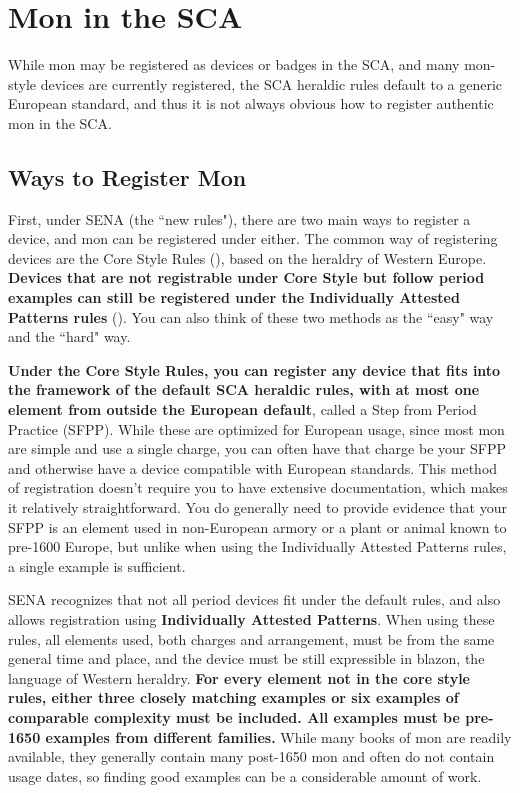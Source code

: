 \documentclass{article}
\begin{document}
\section{Mon in the SCA}

  While mon may be registered as devices or badges in the SCA, and
  many mon-style devices are currently registered, the SCA heraldic
  rules default to a generic European standard, and thus it is not
  always obvious how to register authentic mon in the SCA.

\subsection{Ways to Register Mon}

  First, under SENA (the ``new rules"), there are two main ways to
  register a device, and mon can be registered under either.  The
  common way of registering devices are the Core Style Rules 
  (), based on
  the heraldry of Western Europe.  \textbf{Devices that are not registrable
  under Core Style but follow period examples can still be registered
  under the Individually Attested Patterns rules}
  ().  You can also
  think of these two methods as the ``easy" way and the ``hard" way.

  \textbf{Under the Core Style Rules, you can register any device that fits
  into the framework of the default SCA heraldic rules, with at most
  one element from outside the European default}, called a Step from
  Period Practice (SFPP).  While these are optimized for European
  usage, since most mon are simple and use a single charge, you can
  often have that charge be your SFPP and otherwise have a device
  compatible with European standards.  This method of registration
  doesn't require you to have extensive documentation, which makes it
  relatively straightforward.  You do generally need to provide
  evidence that your SFPP is an element used in non-European armory or
  a plant or animal known to pre-1600 Europe, but unlike when using
  the Individually Attested Patterns rules, a single example is
  sufficient.

  SENA recognizes that not all period devices fit under the default
  rules, and also allows registration using \textbf{Individually Attested
  Patterns}. When using these rules, all elements used, both charges
  and arrangement, must be from the same general time and place, and
  the device must be still expressible in blazon, the language of
  Western heraldry.  \textbf{For every element not in the core style rules,
  either three closely matching examples or six examples of comparable
  complexity must be included.  All examples must be pre-1650 examples
  from different families.}  While many books of mon are readily
  available, they generally contain many post-1650 mon and often do
  not contain usage dates, so finding good examples can be a
  considerable amount of work.
\end{document}
